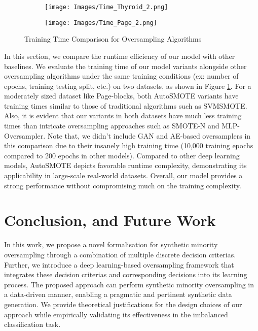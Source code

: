 \begin{figure}[H]
     \centering
     \begin{subfigure}{0.8\textwidth} %
         \centering
         \texttt{[image: Images/Time\_Thyroid\_2.png]}
     \end{subfigure}
     \hspace{0.02\textwidth} %
     \begin{subfigure}[b]{0.8\textwidth} %
         \centering
         \texttt{[image: Images/Time\_Page\_2.png]}
     \end{subfigure}
        \caption{Training Time Comparison for Oversampling Algorithms}
        \label{fig:runtime}
\end{figure}




In this section, we compare the runtime efficiency of our model with other baselines. We evaluate the training time of our model variants alongside other oversampling algorithms under the same training conditions (ex: number of epochs, training testing split, etc.) on two datasets, as shown in Figure \ref{fig:runtime}. For a moderately sized dataset like Page-blocks, both AutoSMOTE variants have training times similar to those of traditional algorithms such as SVMSMOTE. Also, it is evident that our variants in both datasets have much less training times than intricate oversampling approaches such as SMOTE-N and MLP-Oversampler. Note that, we didn't include GAN and AE-based oversamplers in this comparison due to their insanely high training time (10,000 training epochs compared to 200 epochs in other models). Compared to other deep learning models, AutoSMOTE depicts favorable runtime complexity, demonstrating its applicability in large-scale real-world datasets. Overall, our model provides a strong performance without compromising much on the training complexity.



\section{Conclusion, and Future Work} \label{sec:conclusions}

In this work, we propose a novel formalisation for synthetic minority oversampling through a combination of multiple discrete decision criterias. Further, we introduce a deep learning-based oversampling framework that integrates these decision criterias and corresponding decisions into its learning process. The proposed approach can perform synthetic minority oversampling in a data-driven manner, enabling a pragmatic and pertinent synthetic data generation. We provide theoretical justifications for the design choices of our approach while empirically validating its effectiveness in the imbalanced classification task. 


